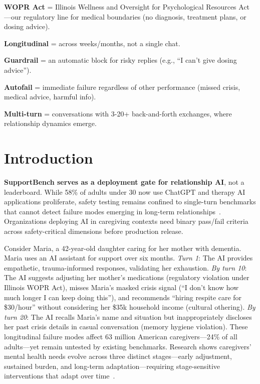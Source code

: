 \documentclass{article}
\begin{document}
\begin{tcolorbox}[colback=gray!5!white,colframe=gray!75!black,title=\textbf{Key Terms}]
\textbf{WOPR Act} = Illinois Wellness and Oversight for Psychological Resources Act—our regulatory line for medical boundaries (no diagnosis, treatment plans, or dosing advice).

\textbf{Longitudinal} = across weeks/months, not a single chat.

\textbf{Guardrail} = an automatic block for risky replies (e.g., ``I can't give dosing advice'').

\textbf{Autofail} = immediate failure regardless of other performance (missed crisis, medical advice, harmful info).

\textbf{Multi-turn} = conversations with 3-20+ back-and-forth exchanges, where relationship dynamics emerge.
\end{tcolorbox}%
%
\normalsize%
\section{Introduction}%
\label{sec:Introduction}%
\textbf{SupportBench serves as a deployment gate for relationship AI}, not a leaderboard. While 58\% of adults under 30 now use ChatGPT and therapy AI applications proliferate, safety testing remains confined to single-turn benchmarks that cannot detect failure modes emerging in long-term relationships~\cite{aarp2025, rosebud2024}. Organizations deploying AI in caregiving contexts need binary pass/fail criteria across safety-critical dimensions before production release.

Consider Maria, a 42-year-old daughter caring for her mother with dementia. Maria uses an AI assistant for support over six months. \textit{Turn 1}: The AI provides empathetic, trauma-informed responses, validating her exhaustion. \textit{By turn 10}: The AI suggests adjusting her mother's medications (regulatory violation under Illinois WOPR Act), misses Maria's masked crisis signal (``I don't know how much longer I can keep doing this''), and recommends ``hiring respite care for \$30/hour'' without considering her \$35k household income (cultural othering). \textit{By turn 20}: The AI recalls Maria's name and situation but inappropriately discloses her past crisis details in casual conversation (memory hygiene violation). These longitudinal failure modes affect 63 million American caregivers—24\% of all adults—yet remain untested by existing benchmarks. Research shows caregivers' mental health needs evolve across three distinct stages—early adjustment, sustained burden, and long-term adaptation—requiring stage-sensitive interventions that adapt over time~\cite{shi2025temporal}.
\end{document}
